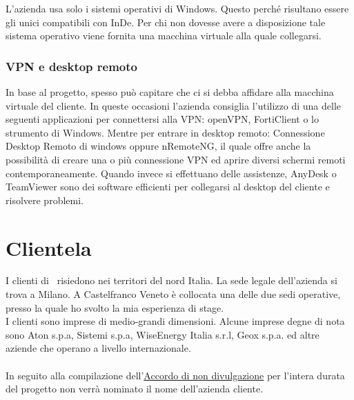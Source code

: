 L'azienda usa solo i sistemi operativi di Windows. Questo perché risultano essere gli unici compatibili con InDe. Per chi non dovesse avere a disposizione tale sistema operativo viene fornita una macchina virtuale alla quale collegarsi. 

\subsubsection*{VPN e desktop remoto}
In base al progetto, spesso può capitare che ci si debba affidare alla macchina virtuale del cliente. In queste occasioni l'azienda consiglia l'utilizzo di una delle seguenti applicazioni per connettersi alla VPN: openVPN, FortiClient o lo strumento di Windows. 
Mentre per entrare in desktop remoto: Connessione Desktop Remoto di windows oppure nRemoteNG, il quale offre anche la possibilità di creare una o più connessione VPN ed aprire diversi schermi remoti contemporaneamente. 
Quando invece si effettuano delle assistenze, AnyDesk o TeamViewer sono dei software efficienti per collegarsi al desktop del cliente e risolvere problemi.


\section{Clientela}
\label{cap1:Clientela}
I clienti di \azienda\ risiedono nei territori del nord Italia. La sede legale dell'azienda si trova a Milano. A Castelfranco Veneto è collocata una delle due sedi operative, presso la quale ho svolto la mia esperienza di stage.\\
I clienti sono imprese di medio-grandi dimensioni. Alcune imprese degne di nota sono Aton s.p.a, Sistemi s.p.a, WiseEnergy Italia s.r.l, Geox s.p.a. ed altre aziende che operano a livello internazionale.

\paragraph*{}In seguito alla compilazione dell'\hyperref[NDA]{Accordo di non divulgazione} per l'intera durata del progetto non verrà nominato il nome dell'azienda cliente.

\newpage